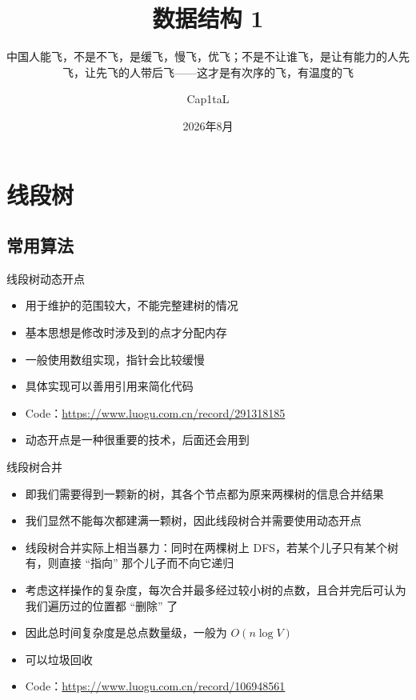 ﻿\documentclass[aspectratio=169]{ctexbeamer}
\author{Cap1taL}
\title{数据结构 1}
\subtitle{中国人能飞，不是不飞，是缓飞，慢飞，优飞；不是不让谁飞，是让有能力的人先飞，让先飞的人带后飞——这才是有次序的飞，有温度的飞}
\date{2026年8月}
\begin{document}
\kaishu

\begin{frame}
    \titlepage
\end{frame}



\section{线段树}

\subsection{常用算法}
\begin{frame}{线段树动态开点}
    \begin{itemize}
        \item 用于维护的范围较大，不能完整建树的情况
        \item 基本思想是修改时涉及到的点才分配内存
        \item 一般使用数组实现，指针会比较缓慢
        \item 具体实现可以善用引用来简化代码
        \item Code：\url{https://www.luogu.com.cn/record/291318185}
        \item 动态开点是一种很重要的技术，后面还会用到
    \end{itemize}
\end{frame}
\begin{frame}{线段树合并}
    \begin{itemize}
        \item 即我们需要得到一颗新的树，其各个节点都为原来两棵树的信息合并结果
        \item 我们显然不能每次都建满一颗树，因此线段树合并需要使用动态开点
        \item 线段树合并实际上相当暴力：同时在两棵树上 DFS，若某个儿子只有某个树有，则直接 “指向” 那个儿子而不向它递归
        \item 考虑这样操作的复杂度，每次合并最多经过较小树的点数，且合并完后可认为我们遍历过的位置都 “删除” 了
        \item 因此总时间复杂度是总点数量级，一般为 $O(n\log V)$
        \item 可以垃圾回收
        \item Code：\url{https://www.luogu.com.cn/record/106948561}
    \end{itemize}
\end{frame}
\end{document}
